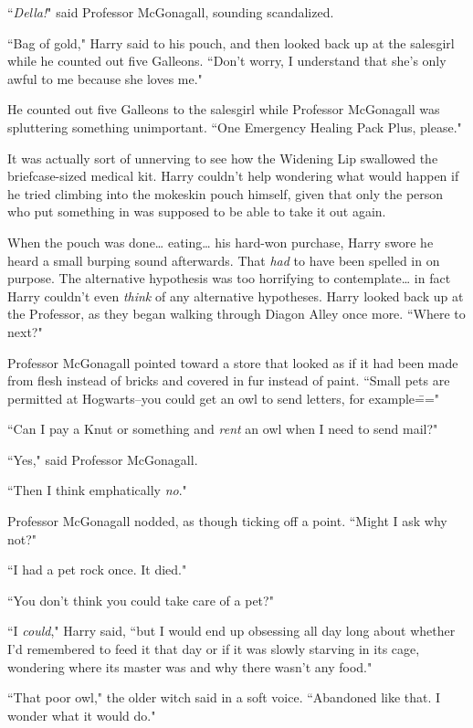 ``\emph{Della!}" said Professor McGonagall, sounding scandalized.

``Bag of gold," Harry said to his pouch, and then looked back up at the salesgirl while he counted out five Galleons. ``Don't worry, I understand that she's only awful to me because she loves me."

He counted out five Galleons to the salesgirl while Professor McGonagall was spluttering something unimportant. ``One Emergency Healing Pack Plus, please."

It was actually sort of unnerving to see how the Widening Lip swallowed the briefcase-sized medical kit. Harry couldn't help wondering what would happen if he tried climbing into the mokeskin pouch himself, given that only the person who put something in was supposed to be able to take it out again.

When the pouch was done{\ldots} eating{\ldots} his hard-won purchase, Harry swore he heard a small burping sound afterwards. That \emph{had} to have been spelled in on purpose. The alternative hypothesis was too horrifying to contemplate{\ldots} in fact Harry couldn't even \emph{think} of any alternative hypotheses. Harry looked back up at the Professor, as they began walking through Diagon Alley once more. ``Where to next?"

Professor McGonagall pointed toward a store that looked as if it had been made from flesh instead of bricks and covered in fur instead of paint. ``Small pets are permitted at Hogwarts\---you could get an owl to send letters, for example\==="

``Can I pay a Knut or something and \emph{rent} an owl when I need to send mail?"

``Yes," said Professor McGonagall.

``Then I think emphatically \emph{no}."

Professor McGonagall nodded, as though ticking off a point. ``Might I ask why not?"

``I had a pet rock once. It died."

``You don't think you could take care of a pet?"

``I \emph{could}," Harry said, ``but I would end up obsessing all day long about whether I'd remembered to feed it that day or if it was slowly starving in its cage, wondering where its master was and why there wasn't any food."

``That poor owl," the older witch said in a soft voice. ``Abandoned like that. I wonder what it would do."

